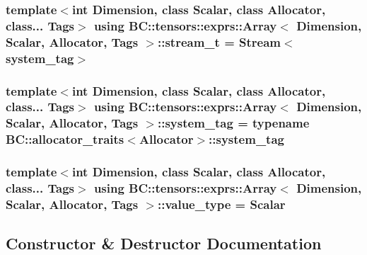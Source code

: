 \subsubsection[{\texorpdfstring{stream\+\_\+t}{stream_t}}]{\setlength{\rightskip}{0pt plus 5cm}template$<$int Dimension, class Scalar, class Allocator, class... Tags$>$ using {\bf B\+C\+::tensors\+::exprs\+::\+Array}$<$ Dimension, {\bf Scalar}, {\bf Allocator}, Tags $>$\+::{\bf stream\+\_\+t} =  {\bf Stream}$<${\bf system\+\_\+tag}$>$}\hypertarget{classBC_1_1tensors_1_1exprs_1_1Array_a1c41223fe60cc224c729fd9bed2a5714}{}\label{classBC_1_1tensors_1_1exprs_1_1Array_a1c41223fe60cc224c729fd9bed2a5714}
\subsubsection[{\texorpdfstring{system\+\_\+tag}{system_tag}}]{\setlength{\rightskip}{0pt plus 5cm}template$<$int Dimension, class Scalar, class Allocator, class... Tags$>$ using {\bf B\+C\+::tensors\+::exprs\+::\+Array}$<$ Dimension, {\bf Scalar}, {\bf Allocator}, Tags $>$\+::{\bf system\+\_\+tag} =  typename {\bf B\+C\+::allocator\+\_\+traits}$<${\bf Allocator}$>$\+::{\bf system\+\_\+tag}}\hypertarget{classBC_1_1tensors_1_1exprs_1_1Array_a96a1013a82e525d29077f0a64c34dcce}{}\label{classBC_1_1tensors_1_1exprs_1_1Array_a96a1013a82e525d29077f0a64c34dcce}
\subsubsection[{\texorpdfstring{value\+\_\+type}{value_type}}]{\setlength{\rightskip}{0pt plus 5cm}template$<$int Dimension, class Scalar, class Allocator, class... Tags$>$ using {\bf B\+C\+::tensors\+::exprs\+::\+Array}$<$ Dimension, {\bf Scalar}, {\bf Allocator}, Tags $>$\+::{\bf value\+\_\+type} =  {\bf Scalar}}\hypertarget{classBC_1_1tensors_1_1exprs_1_1Array_a8af0bfb94c7382d4a22de26e9d93d7f8}{}\label{classBC_1_1tensors_1_1exprs_1_1Array_a8af0bfb94c7382d4a22de26e9d93d7f8}


\subsection{Constructor \& Destructor Documentation}
